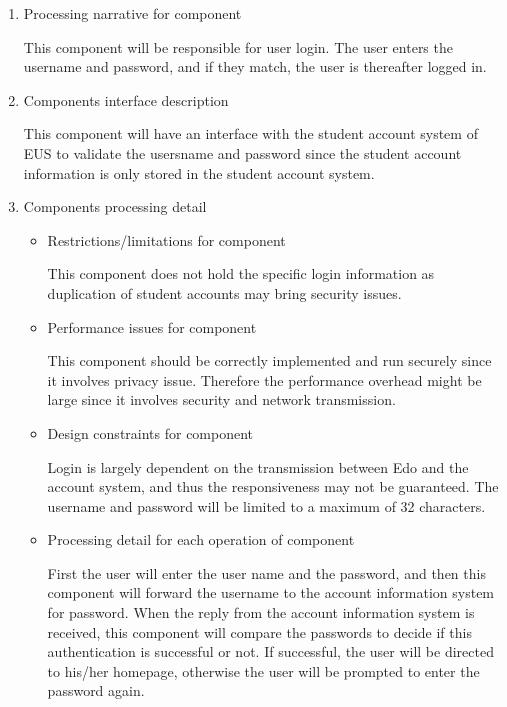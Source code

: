 \documentclass[paper=a4, fontsize=11pt]{scrartcl}
\numberwithin{equation}{section}		%
\numberwithin{figure}{section}			%
\numberwithin{table}{section}				%
\begin{document}
\begin{enumerate}
	\item Processing narrative for component
	\par This component will be responsible for user login. The user enters the username and password, and if they match, the user is thereafter logged in.
	\item Components interface description
	\par This component will have an interface with the student account system of EUS to validate the usersname and password since the student account information is only stored in the student account system.
	\item Components processing detail
	\begin{itemize}
		\item Restrictions/limitations for component
		\par This component does not hold the specific login information as duplication of student accounts may bring security issues.
		\item Performance issues for component 
		\par This component should be correctly implemented and run securely since it involves privacy issue. Therefore the performance overhead might be large since it involves security and network transmission.
		\item Design constraints for component 
		\par Login is largely dependent on the transmission between Edo and the account system, and thus the responsiveness may not be guaranteed. The username and password will be limited to a maximum of 32 characters.
		\item Processing detail for each operation of component 
		\par First the user will enter the user name and the password, and then this component will forward the username to the account information system for password. When the reply from the account information system is received, this component will compare the passwords to decide if this authentication is successful or not. If successful, the user will be directed to his/her homepage, otherwise the user will be prompted to enter the password again.
	\end{itemize}
\end{enumerate}
\end{document}
